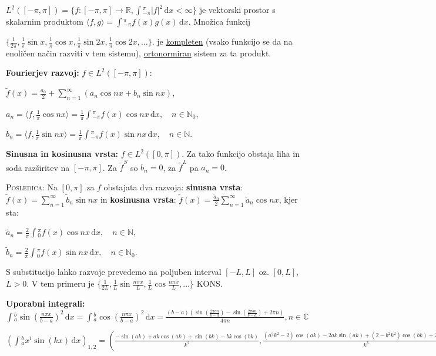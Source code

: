 \documentclass[8pt,a4paper]{amsart}
\theoremstyle{definition} %
\theoremstyle{plain} %
\newcommand{\dx}{\ensuremath{\,\mathrm{d}x}}
\let\oldint\int
\renewcommand{\int}{\oldint \!}
\newcommand{\R}{\mathbb R}
\newcommand{\N}{\mathbb N}
\newcommand{\C}{\mathbb C}
\begin{document}
$L^2([-\pi,\pi]) = \{f:[-\pi,\pi]\longrightarrow \R, \int_{-\pi}^\pi |f|^2
\dx < \infty \}$ je vektorski prostor s skalarnim produktom $\langle f, g\rangle =
\int_{-\pi}^\pi f(x)g(x)\dx$. Množica funkcij

  $\{\frac{1}{2\pi},
  \frac{1}{\pi}\sin{x},\frac{1}{\pi}\cos{x},\frac{1}{\pi}\sin{2x},\frac{1}{\pi}\cos{2x},\ldots
\}$. je \underline{kompleten} (vsako funkcijo se da na enoličen način razviti v
tem sistemu),  \underline{ortonormiran} sistem za ta produkt.

\textbf{Fourierjev razvoj:} $f \in L^2([-\pi,\pi])$:

$\tilde{f}(x) = \frac{a_0}{2} + \sum_{n=1}^{\infty}(a_n\cos{nx} + b_n\sin{nx})$,

$a_n = \langle f,\frac{1}{\pi}\cos{nx} \rangle =
\frac{1}{\pi}\int_{-\pi}^{\pi}f(x)\cos{nx}\dx, \quad n \in \N_0$,

$b_n = \langle f,\frac{1}{\pi}\sin{nx} \rangle =
\frac{1}{\pi}\int_{-\pi}^{\pi}f(x)\sin{nx}\dx, \quad n \in \N$.

\textbf{Sinusna in kosinusna vrsta:} $f \in L^2([0,\pi])$. Za tako funkcijo
obstaja liha in soda razširitev na $[-\pi,\pi]$. Za $\tilde{f}^S$ so $b_n = 0$,
za $\tilde{f}^L$ pa $a_n = 0$.

\textsc{Posledica:} Na $[0,\pi]$ za $f$ obstajata dva razvoja: \textbf{sinusna
vrsta}: $\tilde{f}(x) =  \sum_{n=1}^{\infty} \tilde{b}_n\sin{nx}$ in
\textbf{kosinusna vrsta}:  $\tilde{f}(x) =
\frac{\tilde{a}_0}{2}\sum_{n=1}^{\infty}\tilde{a}_n\cos{nx}$, kjer sta:

$\tilde{a}_n = \frac{2}{\pi}\int_0^{\pi}f(x)\cos{nx}\dx, \quad n \in \N$,

$\tilde{b}_n = \frac{2}{\pi}\int_0^{\pi}f(x)\sin{nx}\dx, \quad n \in \N_0$.

S substitucijo lahko razvoje prevedemo na poljuben interval $[-L,L]$ oz.
$[0,L]$, $L > 0$. V tem primeru je $\{\frac{1}{2L}, \frac{1}{L}\sin{\frac{n\pi
x}{L}},\frac{1}{L}\cos{\frac{n\pi x}{L}},\ldots \}$ KONS.

\textbf{Uporabni integrali:}
$\int_a^b \sin(\frac{n\pi x}{b-a})^2 \dx = \int_a^b \cos(\frac{n\pi x}{b-a})^2 \dx =
\frac{(b-a) \left(\sin \left(\frac{2 \pi  a n}{b-a}\right)-\sin \left(\frac{2
\pi  b n}{b-a}\right)+2 \pi  n\right)}{4 \pi  n}, n \in \C$

$(\int_a^bx^i \sin(kx)\dx)_{1,2} = (\frac{-\sin (a k)+a k \cos (a k)+\sin (b k)-b k \cos (b k)}{k^2},\frac{(a^2 k^2-2) \cos (a k)-2 a k \sin (a k)+(2-b^2 k^2) \cos (b k)+2 b k \sin (b k)}{k^3})$
\end{document}
